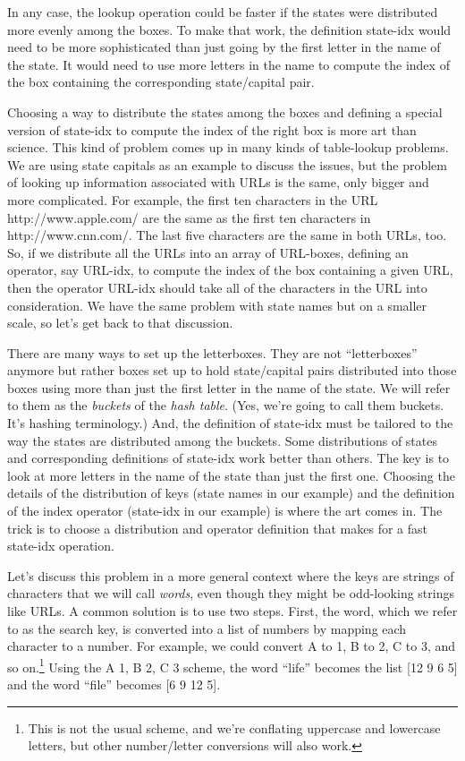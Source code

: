 In any case, the \textsf{lookup} operation could be faster
if the states were distributed more evenly among the boxes.
To make that work, the definition
\textsf{state-idx} would need to be more sophisticated
than just going by the first letter in the name of the state.
It would need to use more letters in the name
to compute the index of the box containing the corresponding
state/capital pair.

Choosing a way to distribute the states among the boxes
and defining a special version of \textsf{state-idx}
to compute the index of the right box is
more art than science. This kind of problem comes up in
many kinds of table-lookup problems. We are using
state capitals as an example to discuss the issues,
but the problem of looking up information associated
with URLs is the same, only bigger and more complicated.
For example, the first ten characters in the URL
http://www.apple.com/ are the same as the first ten
characters in http://www.cnn.com/. The last five
characters are the same in both URLs, too.
So, if we distribute all the URLs into an array of URL-boxes,
defining an operator, say \textsf{URL-idx}, to compute the
index of the box containing a given URL,
then the operator \textsf{URL-idx} should take
all of the characters in the URL into consideration.
We have the same problem with state names but on a
smaller scale, so let's get back to that discussion.

There are many ways to set up the letterboxes.
They are not ``letterboxes'' anymore but rather boxes set up to hold
state/capital pairs distributed into those boxes using
more than just the first letter in the name of the state.
We will refer to them as the
\emph{buckets}
of the \emph{hash table}.
(Yes, we're going to call them buckets. It's hashing terminology.)
And, the definition of \textsf{state-idx} must be
tailored to the way the states are distributed among the buckets.
Some distributions of states and corresponding definitions
of \textsf{state-idx} work better than others.
The key is to look at more letters in the name of the state
than just the first one.
Choosing the details of the distribution of keys
(state names in our example) and the definition of the index operator
(\textsf{state-idx} in our example) is where the art comes in.
The trick is to choose a distribution and operator
definition that makes for a fast \textsf{state-idx} operation.

Let's discuss this problem in a more general context
where the keys are strings of characters that we will
call \emph{words}, even though they might be odd-looking
strings like URLs.
A common solution is to use two steps. First, the word,
which we refer to as the search key, is converted
into a list of numbers by mapping each character to a number. For
example, we could convert A to 1, B to 2, C to 3,
and so on.\footnote{This is not the usual scheme,
and we're conflating uppercase and
lowercase letters, but other number/letter conversions  will also work.}
Using the A 1, B 2, C 3 scheme, the word ``life'' becomes the list
\textsf{[12 9 6 5]}
and the word ``file'' becomes \textsf{[6 9 12 5]}.

